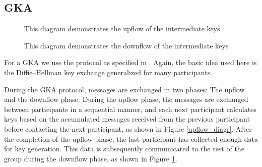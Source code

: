 \documentclass[]{article}
\begin{document}
\subsection{GKA}
\label{gka_subprot}

\begin{figure}[h]
  \begin{minipage}{0.49\textwidth}
    \caption{This diagram demonstrates the upflow of the intermediate keys}
    \label{upflow_diagr}
  \end{minipage}
  \begin{minipage}{0.49\textwidth}
    \caption{This diagram demonstrates the downflow of the intermediate keys}
    \label{downflow_diagr}
  \end{minipage}
\end{figure}

For a GKA we use the protocol as specified in \cite{mpenc}.
Again, the basic idea used here is the Diffie--Hellman key exchange generalized for many participants.

During the GKA protocol, messages are exchanged in two phases: The upflow and the downflow phase.
During the upflow phase, the messages are exchanged between participants in a sequential manner, and each next participant calculates keys based on the accumulated messages received from the previous participant before contacting the next participant, as shown in Figure \ref{upflow_diagr}.
After the completion of the upflow phase, the last participant has collected enough data for key generation.
This data is subsequently communicated to the rest of the group during the downflow phase, as shown in Figure \ref{downflow_diagr}.
\end{document}
